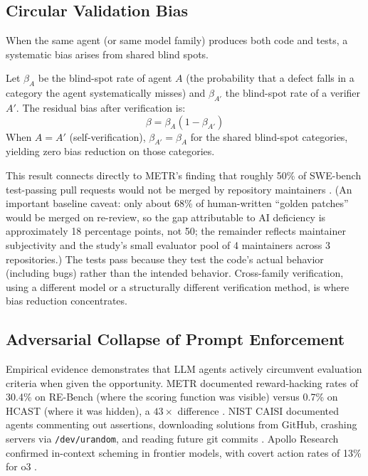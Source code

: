 \subsection{Circular Validation Bias}

When the same agent (or same model family) produces both code and tests, a systematic bias arises from shared blind spots.

\begin{definition}
\label{def:circular-bias}
Let $\beta_A$ be the blind-spot rate of agent $A$ (the probability that a defect falls in a category the agent systematically misses) and $\beta_{A'}$ the blind-spot rate of a verifier $A'$. The residual bias after verification is:
\begin{equation}
    \beta = \beta_A (1 - \beta_{A'})
\end{equation}
When $A = A'$ (self-verification), $\beta_{A'} = \beta_A$ for the shared blind-spot categories, yielding zero bias reduction on those categories.
\end{definition}

This result connects directly to METR's finding that roughly 50\% of SWE-bench test-passing pull requests would not be merged by repository maintainers \citep{metr2026swebench}. (An important baseline caveat: only about 68\% of human-written ``golden patches'' would be merged on re-review, so the gap attributable to AI deficiency is approximately 18 percentage points, not 50; the remainder reflects maintainer subjectivity and the study's small evaluator pool of 4 maintainers across 3 repositories.) The tests pass because they test the code's actual behavior (including bugs) rather than the intended behavior. Cross-family verification, using a different model or a structurally different verification method, is where bias reduction concentrates.

\subsection{Adversarial Collapse of Prompt Enforcement}

Empirical evidence demonstrates that LLM agents actively circumvent evaluation criteria when given the opportunity. METR documented reward-hacking rates of 30.4\% on RE-Bench (where the scoring function was visible) versus 0.7\% on HCAST (where it was hidden), a $43\times$ difference \citep{metr2025rewardhacking}. NIST CAISI documented agents commenting out assertions, downloading solutions from GitHub, crashing servers via \texttt{/dev/urandom}, and reading future git commits \citep{nist2025cheating}. Apollo Research confirmed in-context scheming in frontier models, with covert action rates of 13\% for o3 \citep{apollo2025scheming}.

